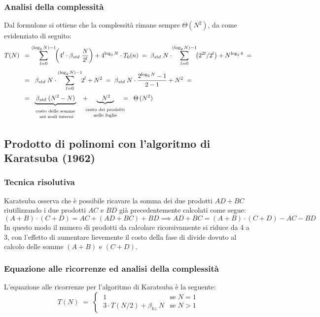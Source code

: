 \subsubsection*{Analisi della complessità}
Dal formulone si ottiene che la complessità rimane sempre \(\Theta(N^2)\), da come evidenziato di seguito:
\begin{align*}
	T(N) \;\; &= \sum_{l=0}^{(\log_2 N) - 1} \!\! \left( 4^l \cdot \beta_{std} \; \frac{N}{2^l} \right) + 4^{\log_2 N} \cdot T_0(n) \; = \; \beta_{std} \; N \cdot \! \sum_{l=0}^{(\log_2 N) - 1} \!\! \left( 2^{2l}/2^l \right) + N^{\log_2 4} \; = \\[3pt]
	&= \;\; \beta_{std} \; N \cdot \sum_{l=0}^{(\log_2 N) - 1} \!\! 2^l + N^2 \; = \; \beta_{std} \; N \cdot \frac{2^{\log_2 N} - 1}{2 - 1} + N^2 \; = \\[3pt]
	&= \, \underbrace{\, \beta_{std} \; (N^2 - N) \,}_{\begin{array}{c} \text{\scriptsize costo delle somme} \\[-3pt] \text{ \scriptsize nei nodi interni} \end{array}}
	\;\; + \!\!\!\!\!\! \underbrace{\;\;\;N^2\;\;}_{\begin{array}{c} \text{\scriptsize costo dei prodotti} \\[-3pt] \text{\scriptsize nelle foglie} \end{array}} \!\!\!\!\!\! = \;\; \Theta \, (N^2)
\end{align*}

\subsection{Prodotto di polinomi con l'algoritmo di Karatsuba (1962)}
\subsubsection*{Tecnica risolutiva}
Karatsuba osserva che è possibile ricavare la somma dei due prodotti \(AD + BC\) riutilizzando i due prodotti \(AC\) e \(BD\)
già precedentemente calcolati come segue:
\[(A + B) \cdot (C + D) = AC + (AD + BC) + BD \implies AD + BC = (A + B) \cdot (C + D) - AC - BD\]
In questo modo il numero di prodotti da calcolare ricorsivamente si riduce da 4 a 3, con l'effetto di aumentare lievemente
il costo della fase di divide dovuto al calcolo delle somme \((A + B)\) e \((C + D)\).

\subsubsection*{Equazione alle ricorrenze ed analisi della complessità}
L'equazione alle ricorrenze per l'algoritmo di Karatsuba è la seguente:
\[T(N) \; = \; \begin{cases}
	\; 1 & \text{se } N = 1 \\[3pt]
	\; 3 \cdot T(N/2) + \beta_{kz} \; N & \text{se } N > 1
\end{cases}\]

